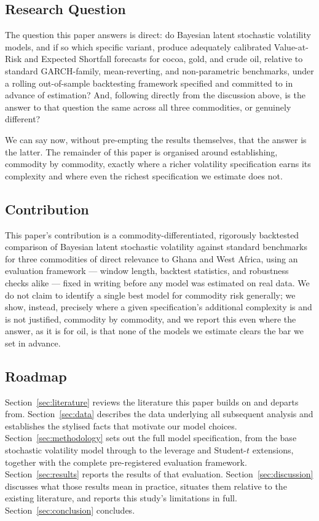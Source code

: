 \documentclass[preprint,12pt,authoryear]{elsarticle}
\begin{document}
\subsection{Research Question}

The question this paper answers is direct: do Bayesian latent stochastic volatility models, and if so which specific variant, produce adequately calibrated Value-at-Risk and Expected Shortfall forecasts for cocoa, gold, and crude oil, relative to standard GARCH-family, mean-reverting, and non-parametric benchmarks, under a rolling out-of-sample backtesting framework specified and committed to in advance of estimation? And, following directly from the discussion above, is the answer to that question the same across all three commodities, or genuinely different?

We can say now, without pre-empting the results themselves, that the answer is the latter. The remainder of this paper is organised around establishing, commodity by commodity, exactly where a richer volatility specification earns its complexity and where even the richest specification we estimate does not.

\subsection{Contribution}

This paper's contribution is a commodity-differentiated, rigorously backtested comparison of Bayesian latent stochastic volatility against standard benchmarks for three commodities of direct relevance to Ghana and West Africa, using an evaluation framework --- window length, backtest statistics, and robustness checks alike --- fixed in writing before any model was estimated on real data. We do not claim to identify a single best model for commodity risk generally; we show, instead, precisely where a given specification's additional complexity is and is not justified, commodity by commodity, and we report this even where the answer, as it is for oil, is that none of the models we estimate clears the bar we set in advance.

\subsection{Roadmap}

Section~\ref{sec:literature} reviews the literature this paper builds on and departs from. Section~\ref{sec:data} describes the data underlying all subsequent analysis and establishes the stylised facts that motivate our model choices. Section~\ref{sec:methodology} sets out the full model specification, from the base stochastic volatility model through to the leverage and Student-$t$ extensions, together with the complete pre-registered evaluation framework. Section~\ref{sec:results} reports the results of that evaluation. Section~\ref{sec:discussion} discusses what those results mean in practice, situates them relative to the existing literature, and reports this study's limitations in full. Section~\ref{sec:conclusion} concludes.
\end{document}
